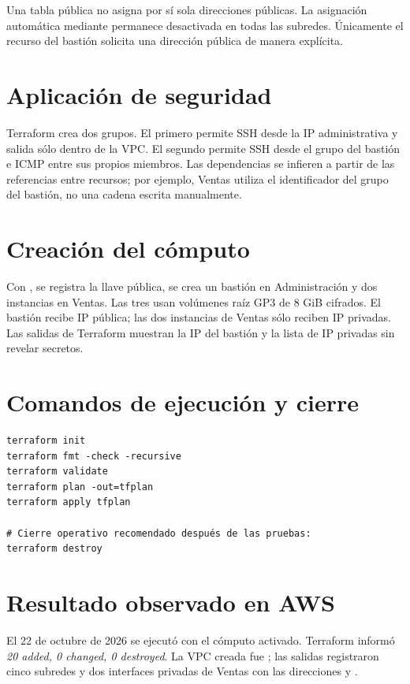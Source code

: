 Una tabla pública no asigna por sí sola direcciones públicas. La asignación automática mediante  permanece desactivada en todas las subredes. Únicamente el recurso del bastión solicita una dirección pública de manera explícita.

\section{Aplicación de seguridad}

Terraform crea dos grupos. El primero permite SSH desde la IP administrativa y salida sólo dentro de la VPC. El segundo permite SSH desde el grupo del bastión e ICMP entre sus propios miembros. Las dependencias se infieren a partir de las referencias entre recursos; por ejemplo, Ventas utiliza el identificador del grupo del bastión, no una cadena escrita manualmente.

\section{Creación del cómputo}

Con , se registra la llave pública, se crea un bastión en Administración y dos instancias en Ventas. Las tres usan volúmenes raíz GP3 de 8 GiB cifrados. El bastión recibe IP pública; las dos instancias de Ventas sólo reciben IP privadas. Las salidas de Terraform muestran la IP del bastión y la lista de IP privadas sin revelar secretos.

\section{Comandos de ejecución y cierre}

\begin{Verbatim}[fontsize=\small,frame=single]
terraform init
terraform fmt -check -recursive
terraform validate
terraform plan -out=tfplan
terraform apply tfplan

# Cierre operativo recomendado después de las pruebas:
terraform destroy
\end{Verbatim}

\section{Resultado observado en AWS}

El 22 de octubre de 2026 se ejecutó  con el cómputo activado. Terraform informó \emph{20 added, 0 changed, 0 destroyed}. La VPC creada fue ; las salidas registraron cinco subredes y dos interfaces privadas de Ventas con las direcciones  y .

